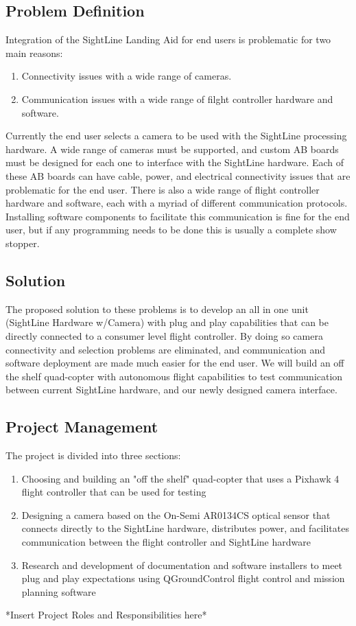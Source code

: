 \documentclass[11pt]{article}
\begin{document}
\subsection{Problem Definition}

Integration of the SightLine Landing Aid for end users is problematic for two main reasons: 

\begin{enumerate}
\item Connectivity issues with a wide range of cameras. 
\item Communication issues with a wide range of filght controller hardware and software.
\end{enumerate} 

Currently the end user selects a camera to be used with the SightLine processing hardware. A wide range of cameras must be supported, and custom AB boards must be designed for each one to interface with the SightLine hardware. Each of these AB boards can have cable, power, and electrical connectivity issues that are problematic for the end user.
There is also a wide range of flight controller hardware and software, each with a myriad of different communication protocols. Installing software components to facilitate this communication is fine for the end user, but if any programming needs to be done this is usually a complete show stopper. 

\subsection{Solution}

The proposed solution to these problems is to develop an all in one unit (SightLine Hardware w/Camera) with plug and play capabilities that can be directly connected to a consumer level flight controller. By doing so camera connectivity and selection problems are eliminated, and communication and software deployment are made much easier for the end user. We will build an off the shelf quad-copter with autonomous flight capabilities to test communication between current SightLine hardware, and our newly designed camera interface.

\subsection{Project Management}

The project is divided into three sections:
\begin{enumerate}
 \item Choosing and building an "off the shelf" quad-copter that uses a Pixhawk 4 flight controller that can be used for testing
 \item Designing a camera based on the On-Semi AR0134CS optical sensor that connects directly to the SightLine hardware, distributes power, and facilitates communication  between the flight controller and SightLine hardware
 \item Research and development of documentation and software installers to meet plug and play expectations using QGroundControl flight control and mission planning software
\end{enumerate}
*Insert Project Roles and Responsibilities here*
\end{document}
